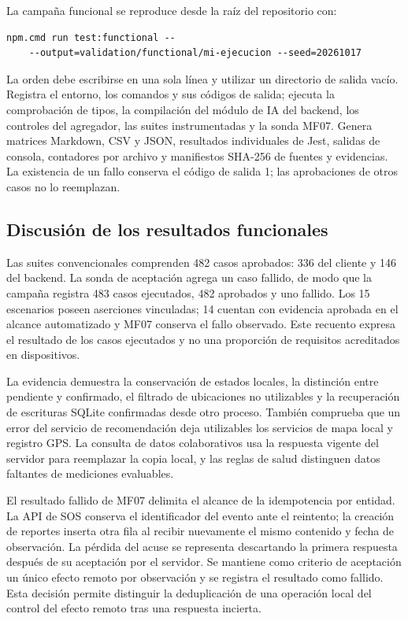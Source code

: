 La campaña funcional se reproduce desde la raíz del repositorio con:
\begin{verbatim}
npm.cmd run test:functional -- 
    --output=validation/functional/mi-ejecucion --seed=20261017
\end{verbatim}
La orden debe escribirse en una sola línea y utilizar un directorio de salida vacío. Registra el entorno, los comandos y sus códigos de salida; ejecuta la comprobación de tipos, la compilación del módulo de IA del backend, los controles del agregador, las suites instrumentadas y la sonda MF07. Genera matrices Markdown, CSV y JSON, resultados individuales de Jest, salidas de consola, contadores por archivo y manifiestos SHA-256 de fuentes y evidencias. La existencia de un fallo conserva el código de salida 1; las aprobaciones de otros casos no lo reemplazan.

\subsection{Discusión de los resultados funcionales}

Las suites convencionales comprenden 482 casos aprobados: 336 del cliente y 146 del backend. La sonda de aceptación agrega un caso fallido, de modo que la campaña registra 483 casos ejecutados, 482 aprobados y uno fallido. Los 15 escenarios poseen aserciones vinculadas; 14 cuentan con evidencia aprobada en el alcance automatizado y MF07 conserva el fallo observado. Este recuento expresa el resultado de los casos ejecutados y no una proporción de requisitos acreditados en dispositivos.

La evidencia demuestra la conservación de estados locales, la distinción entre pendiente y confirmado, el filtrado de ubicaciones no utilizables y la recuperación de escrituras SQLite confirmadas desde otro proceso. También comprueba que un error del servicio de recomendación deja utilizables los servicios de mapa local y registro GPS. La consulta de datos colaborativos usa la respuesta vigente del servidor para reemplazar la copia local, y las reglas de salud distinguen datos faltantes de mediciones evaluables.

El resultado fallido de MF07 delimita el alcance de la idempotencia por entidad. La API de SOS conserva el identificador del evento ante el reintento; la creación de reportes inserta otra fila al recibir nuevamente el mismo contenido y fecha de observación. La pérdida del acuse se representa descartando la primera respuesta después de su aceptación por el servidor. Se mantiene como criterio de aceptación un único efecto remoto por observación y se registra el resultado como fallido. Esta decisión permite distinguir la deduplicación de una operación local del control del efecto remoto tras una respuesta incierta.

